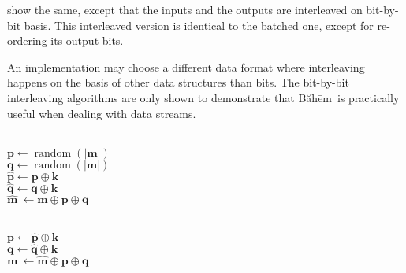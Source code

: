 \documentclass[twocolumn]{article}
\newcommand{\baheem}{Băhēm}
\DeclareMathOperator{\random}{random}
\begin{document}
 show the same, except that
the inputs and the outputs are interleaved on bit-by-bit basis.  This
interleaved version is identical to the batched one, except for re-ordering
its output bits.

An implementation may choose a different data format where interleaving
happens on the basis of other data structures than bits.  The bit-by-bit
interleaving algorithms are only shown to demonstrate that \baheem\ is
practically useful when dealing with data streams.

\begin{algorithm}
    \hrulefill\\
    $\mathbf{p} \gets \random(|\mathbf{m}|)$\\
    $\mathbf{q} \gets \random(|\mathbf{m}|)$\\
    $\mathbf{\hat p} \gets \mathbf{p} \oplus \mathbf{k}$\\
    $\mathbf{\hat q} \gets \mathbf{q} \oplus \mathbf{k}$\\
    $\mathbf{\hat m} \
        \gets \mathbf{m} \oplus \mathbf{p} \oplus \mathbf{q}$\\


    \caption{Batched \baheem\ encryption}
    \label{alg_enc_batched}
\end{algorithm}

\begin{algorithm}
    \Input{$
        \mathbf{k}, \mathbf{\hat p}, \mathbf{\hat q}, \mathbf{\hat m}
    $}
    \hrulefill\\
    $\mathbf{p} \gets \mathbf{\hat p} \oplus \mathbf{k}$\\
    $\mathbf{q} \gets \mathbf{\hat q} \oplus \mathbf{k}$\\
    $\mathbf{m} \
        \gets \mathbf{\hat m} \oplus \mathbf{p} \oplus \mathbf{q}$\\

    \Return{$\mathbf{m}$}

    \caption{Batched \baheem\ decryption}
    \label{alg_dec_batched}
\end{algorithm}
\end{document}
